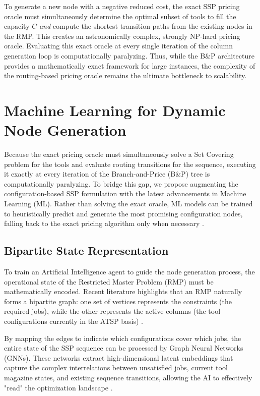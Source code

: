 \documentclass[12pt]{article}
\begin{document}
	To generate a new node with a negative reduced cost, the exact SSP pricing oracle must simultaneously determine the optimal subset of tools to fill the capacity $C$ \textit{and} compute the shortest transition paths from the existing nodes in the RMP. This creates an astronomically complex, strongly NP-hard pricing oracle. Evaluating this exact oracle at every single iteration of the column generation loop is computationally paralyzing. Thus, while the B\&P architecture provides a mathematically exact framework for large instances, the complexity of the routing-based pricing oracle remains the ultimate bottleneck to scalability.
	
	\section{Machine Learning for Dynamic Node Generation}
	
	Because the exact pricing oracle must simultaneously solve a Set Covering problem for the tools and evaluate routing transitions for the sequence, executing it exactly at every iteration of the Branch-and-Price (B\&P) tree is computationally paralyzing. To bridge this gap, we propose augmenting the configuration-based SSP formulation with the latest advancements in Machine Learning (ML). Rather than solving the exact oracle, ML models can be trained to heuristically predict and generate the most promising configuration nodes, falling back to the exact pricing algorithm only when necessary \parencite{Karimi2022}.
	
	\subsection{Bipartite State Representation}
	To train an Artificial Intelligence agent to guide the node generation process, the operational state of the Restricted Master Problem (RMP) must be mathematically encoded. Recent literature highlights that an RMP naturally forms a bipartite graph: one set of vertices represents the constraints (the required jobs), while the other represents the active columns (the tool configurations currently in the ATSP basis) \parencite{Chi2022}. 
	
	By mapping the edges to indicate which configurations cover which jobs, the entire state of the SSP sequence can be processed by Graph Neural Networks (GNNs). These networks extract high-dimensional latent embeddings that capture the complex interrelations between unsatisfied jobs, current tool magazine states, and existing sequence transitions, allowing the AI to effectively "read" the optimization landscape \parencite{Chi2022}.
	
\end{document}
